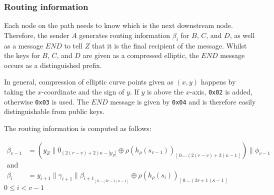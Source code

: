 \subsubsection{Routing information}
Each node on the path needs to know which is the next downstream node. Therefore, the sender $A$ generates routing information $\beta_i$ for $B$, $C$, and $D$, as well as a message $END$ to tell $Z$ that it is the final recipient of the message. Whilst the keys for $B$, $C$, and $D$ are given as a compressed elliptic, the $END$ message occurs as a distinguished prefix.

In general, compression of elliptic curve points given as $(x,y)$ happens by taking the $x$-coordinate and the sign of $y$. If $y$ is above the $x$-axis, \texttt{0x02} is added, otherwise \texttt{0x03} is used. The $END$ message is given by \texttt{0x04} and is therefore easily distinguishable from public keys.

\begin{comment}
The $END$ message is a distinguished prefix byte which is added to the final recipient's compressed public key. For ECDSA public key compression, only the $x$ coordinate is used and is prepended by $02$.

The $y$ coordinate is extracted from $x$ by resolving the secp256k1 elliptic curve equation $Y^2=X^3+7$ \cite{secp}. A square root extraction will yield $Y$ or $-Y$. The compressed point format includes the least significant bit of $Y$ in the first byte (the first byte is $0\times02$ or $0\times03$, depending on that bit).
\end{comment}

The routing information is computed as follows:

\begin{align}
    \beta_{v-1} & =(y_Z\|0_{(2(r-v)+2)\kappa-|y_Z|}\oplus \rho(h_{\rho}(s_{v-1}))_{[ \,0....(2(r-v)+3)\kappa-1\,]})\|\phi_{v-1}                \\
    \text{and}  & \nonumber                                                                                                                    \\
    \beta_i     & =y_{i+1}\|\gamma_{i+1}\|\beta_{{i+1}_{[ \,0....(2r-1)\kappa-1\,] }}\oplus \rho(h_{\rho}(s_{i}))_{[ \,0....(2r+1)\kappa-1\,]}
    \label{eq:2}
\end{align}
$0\le i < v-1$

